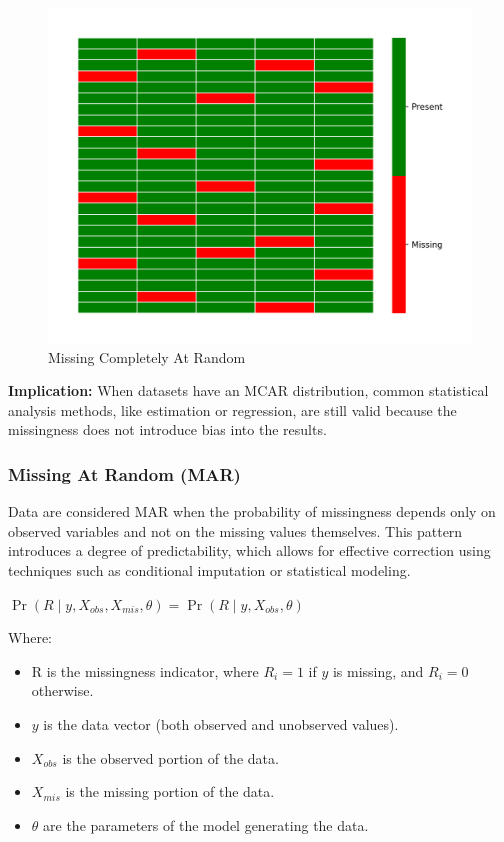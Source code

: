 \documentclass[a4paper,12pt]{article}
\begin{document}
\begin{figure}[H]
    \centering
    \includegraphics[width=0.5\linewidth]{MCAR_heatmap.png}
    \caption{Missing Completely At Random}
    \label{fig:mcar_heatmap}
\end{figure}

\textbf{Implication:} When datasets have an MCAR distribution, common statistical analysis methods, like estimation or regression, are still valid because the missingness does not introduce bias into the results. ~\cite{34}

\subsubsection{Missing At Random (MAR)}

Data are considered MAR when the probability of missingness depends only on observed variables and not on the missing values themselves. This pattern introduces a degree of predictability, which allows for effective correction using techniques such as conditional imputation or statistical modeling. ~\cite{24}

\begin{center}
$\Pr(R \mid y, X_{obs}, X_{mis}, \theta) = \Pr(R \mid y, X_{obs}, \theta)$
\end{center}

Where:
\begin{itemize}
\item R is the missingness indicator, where \( R_i = 1 \) if $y$ is missing, and \( R_i = 0 \) otherwise.
\item $y$ is the data vector (both observed and unobserved values).
\item $X_{obs}$ is the observed portion of the data.
\item $X_{mis}$ is the missing portion of the data.
\item $\theta$ are the parameters of the model generating the data.
\end{itemize}
\end{document}
